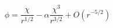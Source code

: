 \begin{equation}
\phi =\frac{\chi }{r^{1/2}}-\alpha \frac{\chi ^{3}}{r^{3/2}}+O(r^{-5/2})
\label{AsymptPhi}
\end{equation}

